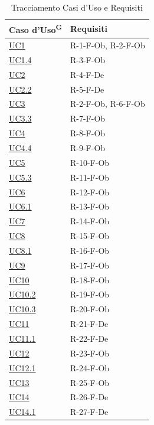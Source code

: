 \documentclass[a4paper, 11pt]{article}
\renewcommand{\arraystretch}{1.4} %
\begin{document}
\renewcommand{\arraystretch}{1.5}
\begin{longtable}[c]{ >{\centering\arraybackslash}m{2.5cm} >{\centering\arraybackslash}m{10cm} }
    \caption{Tracciamento Casi d'Uso e Requisiti} \\
    \rowcolor{AccentDark}
    \color{white}\textbf{Caso d'Uso\textsuperscript{G}} & \color{white}\textbf{Requisiti} \\
    \endhead

    \hyperref[UC1]{UC1} & R-1-F-Ob, R-2-F-Ob \\
    \hyperref[UC1.4]{UC1.4} & R-3-F-Ob \\
    \hyperref[UC2]{UC2} & R-4-F-De \\
    \hyperref[UC2.2]{UC2.2} & R-5-F-De \\
    \hyperref[UC3]{UC3} & R-2-F-Ob, R-6-F-Ob \\
    \hyperref[UC3.3]{UC3.3} & R-7-F-Ob \\
    \hyperref[UC4]{UC4} & R-8-F-Ob \\
    \hyperref[UC4.4]{UC4.4} & R-9-F-Ob \\
    \hyperref[UC5]{UC5} & R-10-F-Ob \\
    \hyperref[UC5.3]{UC5.3} & R-11-F-Ob \\
    \hyperref[UC6]{UC6} & R-12-F-Ob \\
    \hyperref[UC6.1]{UC6.1} & R-13-F-Ob \\
    \hyperref[UC7]{UC7} & R-14-F-Ob \\
    \hyperref[UC8]{UC8} & R-15-F-Ob \\
    \hyperref[UC8.1]{UC8.1} & R-16-F-Ob \\
    \hyperref[UC9]{UC9} & R-17-F-Ob \\
    \hyperref[UC10]{UC10} & R-18-F-Ob \\
    \hyperref[UC10.2]{UC10.2} & R-19-F-Ob \\
    \hyperref[UC10.3]{UC10.3} & R-20-F-Ob \\
    \hyperref[UC11]{UC11} & R-21-F-De \\
    \hyperref[UC11.1]{UC11.1} & R-22-F-De \\
    \hyperref[UC12]{UC12} & R-23-F-Ob \\
    \hyperref[UC12.1]{UC12.1} & R-24-F-Ob \\
    \hyperref[UC13]{UC13} & R-25-F-Ob \\
    \hyperref[UC14]{UC14} & R-26-F-De \\
    \hyperref[UC14.1]{UC14.1} & R-27-F-De \\

\end{longtable}
\end{document}
